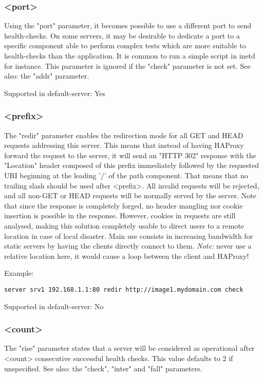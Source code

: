 \subsubsection[port]{ <port>}
  Using the "port" parameter, it becomes possible to use a different port to
  send health-checks. On some servers, it may be desirable to dedicate a port
  to a specific component able to perform complex tests which are more suitable
  to health-checks than the application. It is common to run a simple script in
  inetd for instance. This parameter is ignored if the "check" parameter is not
  set. See also: the "addr" parameter.

  Supported in default-server: Yes

\subsubsection[redir]{ <prefix>}
  The "redir" parameter enables the redirection mode for all GET and HEAD
  requests addressing this server. This means that instead of having HAProxy
  forward the request to the server, it will send an "HTTP 302" response with
  the "Location" header composed of this prefix immediately followed by the
  requested URI beginning at the leading '/' of the path component. That means
  that no trailing slash should be used after <prefix>. All invalid requests
  will be rejected, and all non-GET or HEAD requests will be normally served by
  the server. Note that since the response is completely forged, no header
  mangling nor cookie insertion is possible in the response. However, cookies in
  requests are still analysed, making this solution completely usable to direct
  users to a remote location in case of local disaster. Main use consists in
  increasing bandwidth for static servers by having the clients directly
  connect to them. \emph{Note:} never use a relative location here, it would cause a
  loop between the client and HAProxy!

  Example:
  
  \verb|server srv1 192.168.1.1:80 redir http://image1.mydomain.com check|

  Supported in default-server: No

\subsubsection[rise]{ <count>}
  The "rise" parameter states that a server will be considered as operational
  after <count> consecutive successful health checks. This value defaults to 2
  if unspecified. See also: the "check", "inter" and "fall" parameters.

